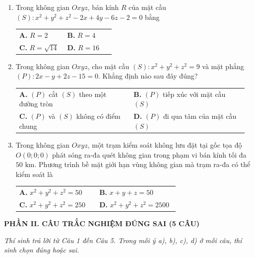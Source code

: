 \documentclass[12pt,a4paper]{article}
\makeatletter
\newcommand{\bonpa}[4]{\par\nobreak\smallskip\nobreak\noindent
\begin{tabular}{@{}p{0.48\linewidth}p{0.48\linewidth}@{}}
\textbf{A.} #1 & \textbf{B.} #2\\[8pt]
\textbf{C.} #3 & \textbf{D.} #4\end{tabular}}
\makeatother
\begin{document}
\begin{enumerate}
\item Trong không gian $Oxyz$, bán kính $R$ của mặt cầu $(S): x^2 + y^2 + z^2 - 2x + 4y - 6z - 2 = 0$ bằng
\bonpa{$R = 2$}{$R = 4$}{$R = \sqrt{14}$}{$R = 16$}

\item Trong không gian $Oxyz$, cho mặt cầu $(S): x^2 + y^2 + z^2 = 9$ và mặt phẳng $(P): 2x - y + 2z - 15 = 0$. Khẳng định nào sau đây đúng?
\bonpa{$(P)$ cắt $(S)$ theo một đường tròn}{$(P)$ tiếp xúc với mặt cầu $(S)$}{$(P)$ và $(S)$ không có điểm chung}{$(P)$ đi qua tâm của mặt cầu $(S)$}

\item Trong không gian $Oxyz$, một trạm kiểm soát không lưu đặt tại gốc tọa độ $O(0; 0; 0)$ phát sóng ra-đa quét không gian trong phạm vi bán kính tối đa $50\text{ km}$. Phương trình bề mặt giới hạn vùng không gian mà trạm ra-đa có thể kiểm soát là
\bonpa{$x^2 + y^2 + z^2 = 50$}{$x + y + z = 50$}{$x^2 + y^2 + z^2 = 250$}{$x^2 + y^2 + z^2 = 2500$}
\end{enumerate}

\newpage
\begin{center}
    {\fontsize{13}{15}\selectfont\textbf{PHẦN II. CÂU TRẮC NGHIỆM ĐÚNG SAI (5 CÂU)}}
\end{center}
\textit{Thí sinh trả lời từ Câu 1 đến Câu 5. Trong mỗi ý a), b), c), d) ở mỗi câu, thí sinh chọn đúng hoặc sai.}

\end{document}
